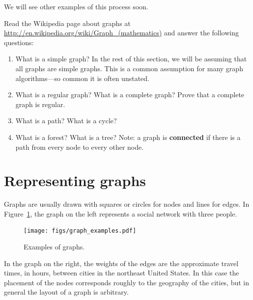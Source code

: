 \documentclass[10pt]{book}
\begin{document}
We will see other examples of this process soon.

\begin{exercise}

Read the Wikipedia page about graphs at
\url{http://en.wikipedia.org/wiki/Graph_(mathematics)}
and answer the following questions:

\begin{enumerate}

\item What is a simple graph?  In the rest of this section,
we will be assuming that all graphs are simple graphs.  This
is a common assumption for many graph algorithms---so
common it is often unstated.

\item What is a regular graph?  What is a complete graph?  Prove
that a complete graph is regular.

\item What is a path?  What is a cycle?

\item What is a forest?  What is a tree?  Note: a graph
is {\bf connected} if there is a path from every node to
every other node.

\end{enumerate}

\end{exercise}



\section{Representing graphs}
\label{graph.py}

Graphs are usually drawn with squares or circles for nodes and lines
for edges.  In Figure~\ref{fig.graphs}, the graph on the left represents
a social network with three people.


\begin{figure}
\centerline{\texttt{[image: figs/graph\_examples.pdf]}}
\caption{Examples of graphs.\label{fig.graphs}}
\end{figure}

In the graph on the right, the weights of the edges are the
approximate travel times, in hours, between cities in the northeast
United States.  In this case the placement of the nodes corresponds
roughly to the geography of the cities, but in general the layout
of a graph is arbitrary.
\end{document}
